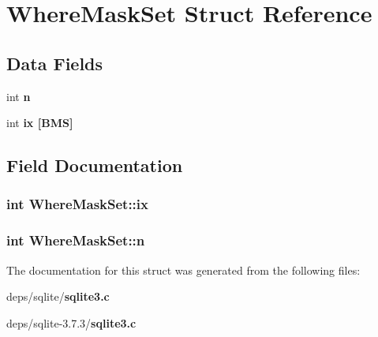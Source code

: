 \section{Where\-Mask\-Set Struct Reference}
\label{structWhereMaskSet}
\subsection*{Data Fields}
\begin{CompactItemize}
\item 
int \bf{n}
\item 
int \bf{ix} [BMS]
\end{CompactItemize}


\subsection{Field Documentation}
\subsubsection{\setlength{\rightskip}{0pt plus 5cm}int \bf{Where\-Mask\-Set::ix}}\label{structWhereMaskSet_10be0a53cfae43802e1bfecf5eafd999}


\subsubsection{\setlength{\rightskip}{0pt plus 5cm}int \bf{Where\-Mask\-Set::n}}\label{structWhereMaskSet_b37fb40fc15a75432700b2ef5fa4d6b7}




The documentation for this struct was generated from the following files:\begin{CompactItemize}
\item 
deps/sqlite/\bf{sqlite3.c}\item 
deps/sqlite-3.7.3/\bf{sqlite3.c}\end{CompactItemize}
